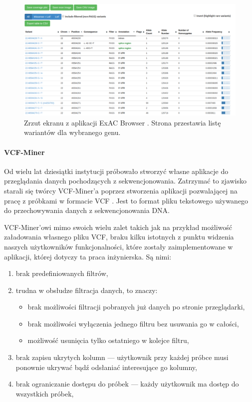 \documentclass[a4paper,12pt,twoside]{article}
\begin{document}
\begin{figure}[h]
\includegraphics[width=\linewidth]{obrazy/exac/broad.png}
\caption{Zrzut ekranu z aplikacji ExAC Browser \cite{exac}. Strona przestawia listę wariantów dla wybranego genu.}
\label{fig:broadpic}
\end{figure}

\newpage

\paragraph{VCF-Miner}

Od wielu lat dziesiątki instytucji próbowało stworzyć własne aplikacje do przeglądania danych pochodzących z sekwencjonowania. Zatrzymać to zjawisko
starali się twórcy VCF-Miner'a \cite{miner} \cite{minerArt} poprzez
stworzenia aplikacji pozwalającej na pracę z próbkami w formacie VCF \cite{vcfformat}. Jest to format pliku tekstowego używanego do przechowywania
danych z sekwencjonowania DNA.

VCF-Miner'owi mimo swoich wielu zalet takich jak na przykład możliwość
załadowania własnego pliku VCF, braku kilku istotnych z
punktu widzenia naszych użytkowników funkcjonalności, które zostały zaimplementowane w aplikacji, której dotyczy ta praca inżynierska.
Są nimi:
\begin{enumerate}[1)]
\item brak predefiniowanych filtrów,
\item trudna w obsłudze filtracja danych, to znaczy:
\begin{itemize}
\item brak możliwości filtracji pobranych już danych po stronie przeglądarki,
\item brak możliwości wyłączenia jednego filtru bez usuwania go w całości,
\item możliwość usunięcia tylko ostatniego w kolejce filtru,
\end{itemize}
\item brak zapisu ukrytych kolumn — użytkownik przy każdej próbce
musi ponownie ukrywać bądź odsłaniać interesujące go kolumny,
\item brak ograniczanie dostępu do próbek — każdy użytkownik ma dostęp
do wszystkich próbek,
\end{enumerate}
\newpage
\end{document}
